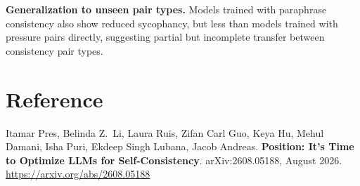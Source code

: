 \documentclass[10pt,twocolumn]{article}
\begin{document}
\textbf{Generalization to unseen pair types.} Models trained with paraphrase
consistency also show reduced sycophancy, but less than models trained with
pressure pairs directly, suggesting partial but incomplete transfer between
consistency pair types.

\section*{Reference}

Itamar Pres, Belinda Z.~Li, Laura Ruis, Zifan Carl Guo, Keya Hu, Mehul Damani,
Isha Puri, Ekdeep Singh Lubana, Jacob Andreas.
\textbf{Position: It's Time to Optimize LLMs for Self-Consistency}.
arXiv:2608.05188, August 2026.
\url{https://arxiv.org/abs/2608.05188}
\end{document}
